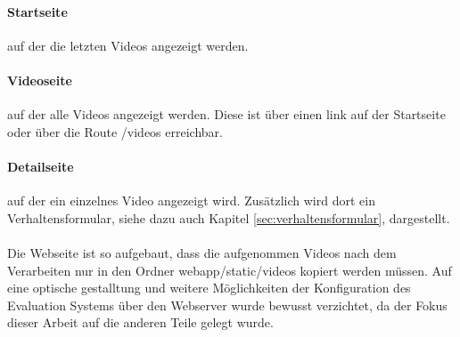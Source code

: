 \paragraph{Startseite} auf der die letzten Videos angezeigt werden.

\paragraph{Videoseite} auf der alle Videos angezeigt werden. Diese ist über einen link auf der Startseite oder über die Route /videos erreichbar.

\paragraph{Detailseite} auf der ein einzelnes Video angezeigt wird. Zusätzlich wird dort ein Verhaltensformular, siehe dazu auch Kapitel \ref{sec:verhaltensformular}, dargestellt. \\
\\
Die Webseite ist so aufgebaut, dass die aufgenommen Videos nach dem Verarbeiten nur in den Ordner webapp/static/videos kopiert werden müssen. Auf eine optische gestalltung und weitere Möglichkeiten der Konfiguration des Evaluation Systems über den Webserver wurde bewusst verzichtet, da der Fokus dieser Arbeit auf die anderen Teile gelegt wurde.

